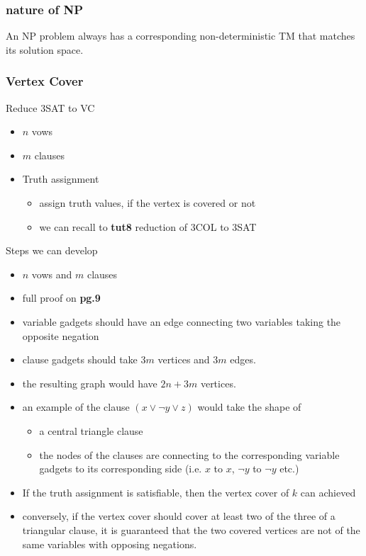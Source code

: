 \documentclass{article}
\newcommand{\tb}[1]{\textbf{#1}}
\theoremstyle{definition}
\theoremstyle{remark}
\begin{document}
\subsubsection*{nature of NP}
An NP problem always has a corresponding non-deterministic TM that matches its solution space.

\subsubsection*{Vertex Cover}
Reduce 3SAT to VC
\begin{itemize}
    \item $n$ vows
    \item $m$ clauses
    \item Truth assignment
    \begin{itemize}
        \item assign truth values, if the vertex is covered or not
        \item we can recall to \tb{tut8} reduction of 3COL to 3SAT
    \end{itemize}
\end{itemize}

Steps we can develop
\begin{itemize}
    \item $n$ vows and $m$ clauses
    \item full proof on \tb{pg.9}
    \item variable gadgets should have an edge connecting two variables taking the opposite negation
    \item clause gadgets should take $3m$ vertices and $3m$ edges.
    \item the resulting graph would have $2n + 3m$ vertices.
    \item an example of the clause $(x \vee \neg y \vee z)$ would take the shape of
    \begin{itemize}
        \item a central triangle clause
        \item the nodes of the clauses are connecting to the corresponding variable gadgets to its corresponding side (i.e. $x$ to $x$, $\neg y$ to $\neg y$ etc.)
    \end{itemize}
    \item If the truth assignment is satisfiable, then the vertex cover of $k$ can achieved
    \item conversely, if the vertex cover should cover at least two of the three of a triangular clause, it is guaranteed that the two covered vertices are not of the same variables with opposing negations.
\end{itemize}
\end{document}
